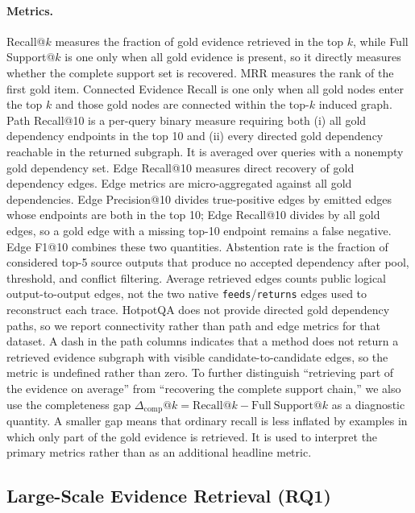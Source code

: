 \paragraph{Metrics.}
Recall@$k$ measures the fraction of gold evidence retrieved in the
top $k$, while Full Support@$k$ is one only when all gold evidence is
present, so it directly measures whether the complete support set is
recovered. MRR measures the rank of the first gold item. Connected
Evidence Recall is one only when all gold nodes enter the top $k$ and those
gold nodes are connected within the top-$k$ induced graph. Path Recall@10
is a per-query binary measure requiring both (i) all gold dependency
endpoints in the top 10 and (ii) every directed gold dependency reachable
in the returned subgraph. It is averaged over queries with a nonempty gold
dependency set. Edge Recall@10 measures direct recovery of gold
dependency edges. Edge metrics are micro-aggregated against all gold dependencies. Edge
Precision@10 divides true-positive edges by emitted edges whose endpoints
are both in the top 10; Edge Recall@10 divides by all gold edges, so a gold
edge with a missing top-10 endpoint remains a false negative. Edge F1@10
combines these two quantities. Abstention rate is the fraction of considered top-5 source outputs
that produce no accepted dependency after pool, threshold, and conflict
filtering. Average retrieved edges counts public logical output-to-output
edges, not the two native \texttt{feeds}/\texttt{returns} edges used to
reconstruct each trace. HotpotQA does not provide directed gold dependency
paths, so we report connectivity rather than path and edge metrics for that
dataset. A dash in the path columns indicates that a method does not return a
retrieved evidence subgraph with visible candidate-to-candidate edges, so
the metric is undefined rather than zero.
To further distinguish ``retrieving part of the evidence on average''
from ``recovering the complete support chain,'' we also use the
completeness gap
$\Delta_{\mathrm{comp}}@k=\mathrm{Recall}@k-\mathrm{Full\ Support}@k$
as a diagnostic quantity. A smaller gap means that ordinary recall is
less inflated by examples in which only part of the gold evidence is
retrieved. It is used to interpret the primary metrics rather than as
an additional headline metric.

\subsection{Large-Scale Evidence Retrieval (RQ1)}

